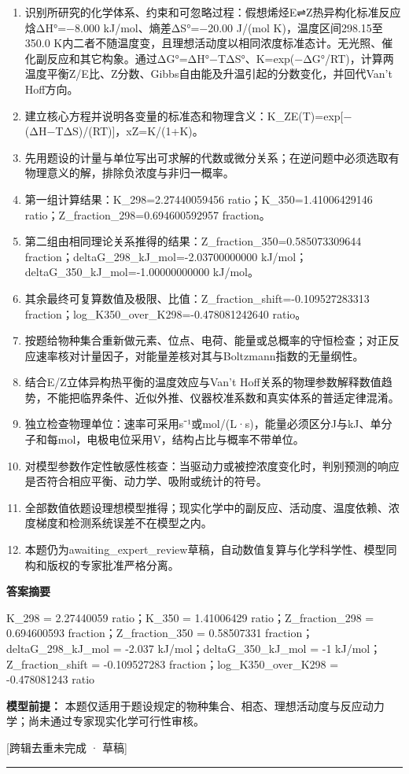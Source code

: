\documentclass[UTF8,11pt,a4paper]{ctexart}
\begin{document}
\begin{enumerate}
\item 识别所研究的化学体系、约束和可忽略过程：假想烯烃E⇌Z热异构化标准反应焓ΔH°=−8.000 kJ/mol、熵差ΔS°=−20.00 J/(mol K)，温度区间298.15至350.0 K内二者不随温度变，且理想活动度以相同浓度标准态计。无光照、催化副反应和其它构象。通过ΔG°=ΔH°−TΔS°、K=exp(−ΔG°/RT)，计算两温度平衡Z/E比、Z分数、Gibbs自由能及升温引起的分数变化，并回代Van’t Hoff方向。
\item 建立核心方程并说明各变量的标准态和物理含义：K\_ZE(T)=exp[−(ΔH−TΔS)/(RT)]，xZ=K/(1+K)。
\item 先用题设的计量与单位写出可求解的代数或微分关系；在逆问题中必须选取有物理意义的解，排除负浓度与非归一概率。
\item 第一组计算结果：K\_298=2.27440059456 ratio；K\_350=1.41006429146 ratio；Z\_fraction\_298=0.694600592957 fraction。
\item 第二组由相同理论关系推得的结果：Z\_fraction\_350=0.585073309644 fraction；deltaG\_298\_kJ\_mol=-2.03700000000 kJ/mol；deltaG\_350\_kJ\_mol=-1.00000000000 kJ/mol。
\item 其余最终可复算数值及极限、比值：Z\_fraction\_shift=-0.109527283313 fraction；log\_K350\_over\_K298=-0.478081242640 ratio。
\item 按题给物种集合重新做元素、位点、电荷、能量或总概率的守恒检查；对正反应速率核对计量因子，对能量差核对其与Boltzmann指数的无量纲性。
\item 结合E/Z立体异构热平衡的温度效应与Van’t Hoff关系的物理参数解释数值趋势，不能把临界条件、近似外推、仪器校准系数和真实体系的普适定律混淆。
\item 独立检查物理单位：速率可采用s⁻¹或mol/(L·s)，能量必须区分J与kJ、单分子和每mol，电极电位采用V，结构占比与概率不带单位。
\item 对模型参数作定性敏感性核查：当驱动力或被控浓度变化时，判别预测的响应是否符合相应平衡、动力学、吸附或统计的符号。
\item 全部数值依题设理想模型推得；现实化学中的副反应、活动度、温度依赖、浓度梯度和检测系统误差不在模型之内。
\item 本题仍为awaiting\_expert\_review草稿，自动数值复算与化学科学性、模型同构和版权的专家批准严格分离。
\end{enumerate}
\noindent\textbf{答案摘要}\par
K\_298 = 2.27440059 ratio；K\_350 = 1.41006429 ratio；Z\_fraction\_298 = 0.694600593 fraction；Z\_fraction\_350 = 0.58507331 fraction；deltaG\_298\_kJ\_mol = -2.037 kJ/mol；deltaG\_350\_kJ\_mol = -1 kJ/mol；Z\_fraction\_shift = -0.109527283 fraction；log\_K350\_over\_K298 = -0.478081243 ratio\par
\noindent\textbf{模型前提：}
本题仅适用于题设规定的物种集合、相态、理想活动度与反应动力学；尚未通过专家现实化学可行性审核。\par
\noindent\textcolor{red!65!black}{[跨辑去重未完成 · 草稿]} \par
\medskip\hrule\medskip
{}
\end{document}
